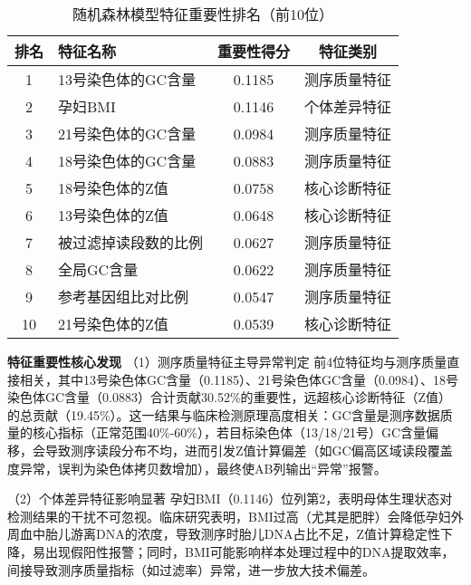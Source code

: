 \documentclass[withoutpreface,bwprint]{cumcmthesis} %
\begin{document}
\begin{table}[H]
    \centering  %
    \caption{随机森林模型特征重要性排名（前10位）}  %
    \label{tab:随机森林模型特征排名}  %
    \begin{threeparttable}
        \begin{tabularx}{0.75\textwidth}{c l c c}
            \toprule[1.5pt]
            \textbf{排名} & \textbf{特征名称} & \textbf{重要性得分} & \textbf{特征类别} \\ 
            \midrule[1pt]
            1    & 13号染色体的GC含量      & 0.1185     & 测序质量特征     \\
            2    & 孕妇BMI                 & 0.1146     & 个体差异特征     \\
            3    & 21号染色体的GC含量      & 0.0984     & 测序质量特征     \\
            4    & 18号染色体的GC含量      & 0.0883     & 测序质量特征     \\
            5    & 18号染色体的Z值         & 0.0758     & 核心诊断特征     \\
            6    & 13号染色体的Z值         & 0.0648     & 核心诊断特征     \\
            7    & 被过滤掉读段数的比例    & 0.0627     & 测序质量特征     \\
            8    & 全局GC含量              & 0.0622     & 测序质量特征     \\
            9    & 参考基因组比对比例      & 0.0547     & 测序质量特征     \\
            10   & 21号染色体的Z值         & 0.0539     & 核心诊断特征     \\

            \bottomrule[1.5pt]
        \end{tabularx}
    \end{threeparttable}
\end{table}


\textbf{特征重要性核心发现}
（1）测序质量特征主导异常判定
前4位特征均与测序质量直接相关，其中13号染色体GC含量（0.1185）、21号染色体GC含量（0.0984）、18号染色体GC含量（0.0883）合计贡献30.52\%的重要性，远超核心诊断特征（Z值）的总贡献（19.45\%）。这一结果与临床检测原理高度相关：GC含量是测序数据质量的核心指标（正常范围40\%-60\%），若目标染色体（13/18/21号）GC含量偏移，会导致测序读段分布不均，进而引发Z值计算偏差（如GC偏高区域读段覆盖度异常，误判为染色体拷贝数增加），最终使AB列输出“异常”报警。

（2）个体差异特征影响显著
孕妇BMI（0.1146）位列第2，表明母体生理状态对检测结果的干扰不可忽视。临床研究表明，BMI过高（尤其是肥胖）会降低孕妇外周血中胎儿游离DNA的浓度，导致测序时胎儿DNA占比不足，Z值计算稳定性下降，易出现假阳性报警；同时，BMI可能影响样本处理过程中的DNA提取效率，间接导致测序质量指标（如过滤率）异常，进一步放大技术偏差。
\end{document}
